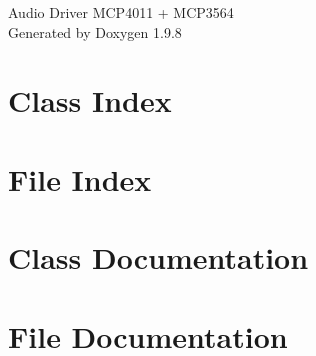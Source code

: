 \documentclass[twoside]{book}
\newcommand{\+}{\discretionary{\mbox{\scriptsize$\hookleftarrow$}}{}{}}
\newcommand{\clearemptydoublepage}{%
    \newpage{\pagestyle{empty}\cleardoublepage}%
  }
\begin{document}
  \raggedbottom
    \hypersetup{pageanchor=false,
                bookmarksnumbered=true,
                pdfencoding=unicode
               }
  \begin{titlepage}
  \vspace*{7cm}
  \begin{center}%
  {\Large Audio Driver MCP4011 + MCP3564}\\
  \vspace*{1cm}
  {\large Generated by Doxygen 1.9.8}\\
  \end{center}
  \end{titlepage}
  \clearemptydoublepage
  \tableofcontents
  \clearemptydoublepage
  \hypersetup{pageanchor=true}
\chapter{Class Index}

\chapter{File Index}

\chapter{Class Documentation}



\chapter{File Documentation}




















  \backmatter
  \newpage
  \clearemptydoublepage
  \printindex
\end{document}
